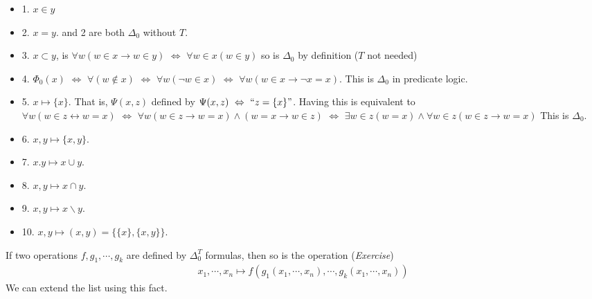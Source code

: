\documentclass[12pt,a4paper]{article}
\renewenvironment{i}
{\begin{itemize} 
	}%
	{\end{itemize}
}
\begin{document}
\begin{i}
\item[1.] $x\in y$
\item[2.] $x=y$.  and 2 are both $\Delta_0$ without $T$.
\item[3.] $x\subset y$, is $\forall w(w\in x \rightarrow w\in y) \,\, \Leftrightarrow \,\,\forall w\in x(w\in y)$ so is $\Delta_0$ by definition ($T$ not needed)
\item[4.] $\Phi_0 (x) \,\, \Leftrightarrow \,\, \forall (w\not\in x) \,\, \Leftrightarrow \,\, \forall w(\neg w\in x) \,\, \Leftrightarrow \,\, \forall w(w\in x \rightarrow \neg x =x)$. This is $\Delta_0$ in predicate logic.
\item[5.] $x\mapsto \{x\}$. That is, $\Psi(x,z)$ defined by $\Psi(x,z)\,\, \Leftrightarrow \,\, ``z= \{x\}"$. Having this is equivalent to $\forall w (w\in z \leftrightarrow w=x) \,\, \Leftrightarrow \,\, \forall w(w\in z \rightarrow w=x)\wedge (w=x \rightarrow w\in z) \,\, \Leftrightarrow \,\, \exists w\in z(w=x) \wedge \forall w\in z (w\in z \rightarrow w=x)$ This is $\Delta_0$.
\item[6.] $x,y\mapsto \{x,y\}$.
\item[7.] $x.y\mapsto x\cup y$.
\item[8.] $x,y\mapsto x\cap y$.
\item[9.] $x,y\mapsto x\backslash y$.
\item[10.] $x,y \mapsto (x,y) = \{\{x\}, \{x,y\}\}$.
\end{i}
If two operations $f,g_1, \cdots, g_k$ are defined by $\Delta_0^T$ formulas, then so is the operation (\emph{Exercise})
\begin{align*}
x_1, \cdots, x_n \mapsto f(g_1(x_1, \cdots, x_n),\cdots, g_k(x_1, \cdots, x_n))
\end{align*}
We can extend the list using this fact.
\end{document}
